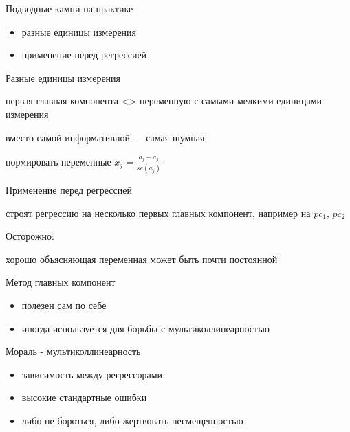 \documentclass[ignorenonframetext,]{beamer}
\begin{document}
\begin{frame}{Подводные камни на практике}

\begin{itemize}
\itemsep1pt\parskip0pt
\item
  разные единицы измерения
\item
  применение перед регрессией
\end{itemize}

\end{frame}

\begin{frame}{Разные единицы измерения}

первая главная компонента \textless{}\textgreater{} переменную с самыми
мелкими единицами измерения

вместо самой информативной --- самая шумная

нормировать переменные \(x_j=\frac{a_j-\bar{a}_j}{se(a_j)}\)

\end{frame}

\begin{frame}{Применение перед регрессией}

строят регрессию на несколько первых главных компонент, например на
\(pc_1\), \(pc_2\)

Осторожно:

хорошо объясняющая переменная может быть почти постоянной

\end{frame}

\begin{frame}{Метод главных компонент}

\begin{itemize}
\itemsep1pt\parskip0pt
\item
  полезен сам по себе
\item
  иногда используется для борьбы с мультиколлинеарностью
\end{itemize}

\end{frame}

\begin{frame}{Мораль - мультиколлинеарность}

\begin{itemize}
\item
  зависимость между регрессорами
\item
  высокие стандартные ошибки
\item
  либо не бороться, либо жертвовать несмещенностью
\end{itemize}

\end{frame}
\end{document}

